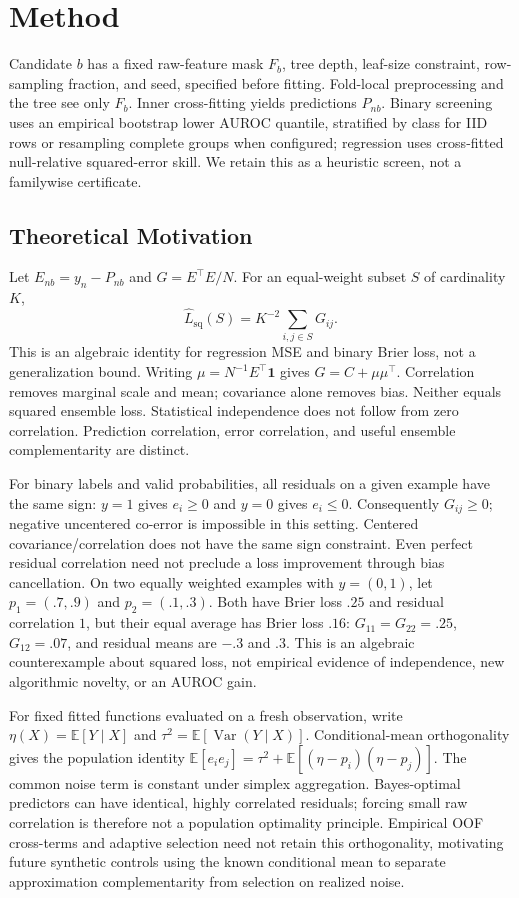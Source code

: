 \section{Method}
Candidate $b$ has a fixed raw-feature mask $F_b$, tree depth, leaf-size constraint,
row-sampling fraction, and seed, specified before fitting. Fold-local preprocessing
and the tree see only $F_b$. Inner cross-fitting yields predictions $P_{nb}$.
Binary screening uses an empirical bootstrap lower AUROC quantile, stratified
by class for IID rows or resampling complete groups when configured;
regression uses cross-fitted null-relative squared-error skill. We retain this as
a heuristic screen, not a familywise certificate.

\subsection{Theoretical Motivation}
Let $E_{nb}=y_n-P_{nb}$ and $G=E^\top E/N$. For an equal-weight subset $S$ of
cardinality $K$,
\begin{equation}
\widehat L_{\mathrm{sq}}(S)=K^{-2}\sum_{i,j\in S}G_{ij}.
\end{equation}
This is an algebraic identity for regression MSE and binary Brier loss, not a
generalization bound. Writing $\mu=N^{-1}E^\top\mathbf 1$ gives
$G=C+\mu\mu^\top$. Correlation removes marginal scale and mean; covariance
alone removes bias. Neither equals squared ensemble loss. Statistical independence
does not follow from zero correlation. Prediction correlation, error correlation,
and useful ensemble complementarity are distinct.

For binary labels and valid probabilities, all residuals on a given example
have the same sign: $y=1$ gives $e_i\ge0$ and $y=0$ gives $e_i\le0$.
Consequently $G_{ij}\ge0$; negative uncentered co-error is impossible in this
setting. Centered covariance/correlation does not have the same sign constraint.
Even perfect residual correlation need not preclude a loss improvement through
bias cancellation. On two equally weighted examples with $y=(0,1)$, let
$p_1=(.7,.9)$ and $p_2=(.1,.3)$. Both have Brier loss $.25$ and residual
correlation $1$, but their equal average has Brier loss $.16$:
$G_{11}=G_{22}=.25$, $G_{12}=.07$, and residual means are $-.3$ and $.3$.
This is an algebraic counterexample about squared loss, not empirical evidence
of independence, new algorithmic novelty, or an AUROC gain.

For fixed fitted functions evaluated on a fresh observation, write
$\eta(X)=\mathbb E[Y\mid X]$ and $\tau^2=\mathbb E[\operatorname{Var}(Y\mid X)]$.
Conditional-mean orthogonality gives the population identity
$\mathbb E[e_i e_j]=\tau^2+\mathbb E[(\eta-p_i)(\eta-p_j)]$.
The common noise term is constant under simplex aggregation. Bayes-optimal
predictors can have identical, highly correlated residuals; forcing small raw
correlation is therefore not a population optimality principle. Empirical OOF
cross-terms and adaptive selection need not retain this orthogonality, motivating
future synthetic controls using the known conditional mean to separate
approximation complementarity from selection on realized noise.

